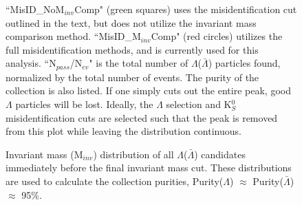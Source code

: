 \documentclass[../AnalysisNoteJBuxton.tex]{subfiles}
\begin{document}
\begin{figure}[h!]
{  ``MisID\_NoM$_{inv}$Comp" (green squares) uses the misidentification cut outlined in the text, but does not utilize the invariant mass comparison method.
  ``MisID\_M$_{inv}$Comp" (red circles) utilizes the full misidentification methods, and is currently used for this analysis.  
  ``N$_{pass}$/N$_{ev}$" is the total number of $\Lambda$($\bar{\Lambda}$) particles found, normalized by the total number of events.  The purity of the collection is also listed.   
If one simply cuts out the entire peak, good $\Lambda$ particles will be lost.
Ideally, the $\Lambda$ selection and K$^{0}_{S}$ misidentification cuts are selected such that the peak is removed from this plot while leaving the distribution continuous.}
  \label{fig:MassAssK0ShortHyp_cLamK0}
\end{figure}


\begin{figure}[h!]
  \centering
  \caption[$\Lambda$ and $\bar{\Lambda}$ Purity]{Invariant mass (M$_{inv}$) distribution of all $\Lambda$($\bar{\Lambda}$) candidates immediately before the final invariant mass cut.  These distributions are used to calculate the collection purities, Purity($\Lambda$) $\approx$ Purity($\bar{\Lambda}$) $\approx$ 95\%.}
  \label{fig:cLamPurity}
\end{figure}
\end{document}

